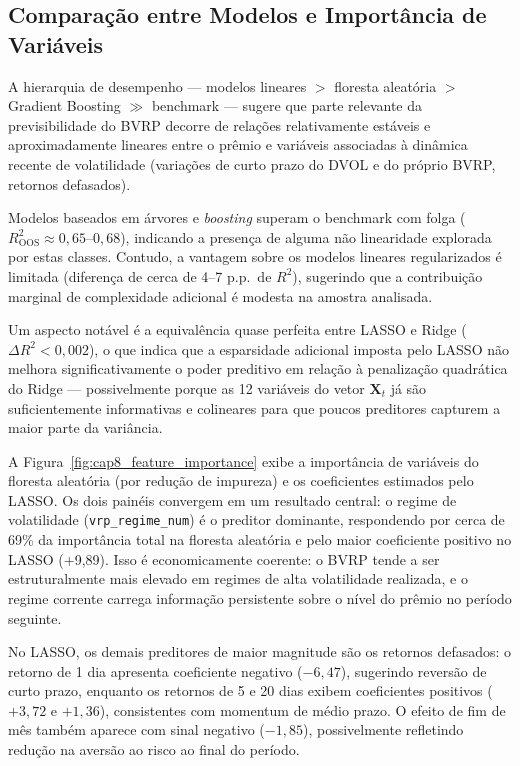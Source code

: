 \subsection{Comparação entre Modelos e Importância de Variáveis}
\label{sec:cap8_comparacao}

A hierarquia de desempenho --- modelos lineares $>$ floresta aleatória $>$ Gradient
Boosting $\gg$ benchmark --- sugere que parte relevante da previsibilidade do BVRP
decorre de relações relativamente estáveis e aproximadamente lineares entre o prêmio
e variáveis associadas à dinâmica recente de volatilidade (variações de curto prazo
do DVOL e do próprio BVRP, retornos defasados).

Modelos baseados em árvores e \textit{boosting} superam o benchmark com folga
($R^2_{\text{OOS}} \approx 0{,}65$--$0{,}68$), indicando a presença de alguma
não linearidade explorada por estas classes. Contudo, a vantagem sobre os modelos
lineares regularizados é limitada (diferença de cerca de 4--7 p.p.\ de $R^2$),
sugerindo que a contribuição marginal de complexidade adicional é modesta na
amostra analisada.

Um aspecto notável é a equivalência quase perfeita entre LASSO e Ridge
($\Delta R^2 < 0{,}002$), o que indica que a esparsidade adicional imposta
pelo LASSO não melhora significativamente o poder preditivo em relação à
penalização quadrática do Ridge --- possivelmente porque as 12 variáveis do vetor
$\mathbf{X}_t$ já são suficientemente informativas e colineares para que
poucos preditores capturem a maior parte da variância.

A Figura~\ref{fig:cap8_feature_importance} exibe a importância de variáveis
do floresta aleatória (por redução de impureza) e os coeficientes estimados pelo LASSO.
Os dois painéis convergem em um resultado central: o regime de volatilidade
(\texttt{vrp\_regime\_num}) é o preditor dominante, respondendo por cerca de 69\%
da importância total na floresta aleatória e pelo maior coeficiente positivo no LASSO
(+9,89). Isso é economicamente coerente: o BVRP tende a ser estruturalmente mais
elevado em regimes de alta volatilidade realizada, e o regime corrente carrega
informação persistente sobre o nível do prêmio no período seguinte.

No LASSO, os demais preditores de maior magnitude são os retornos defasados:
o retorno de 1 dia apresenta coeficiente negativo ($-6{,}47$), sugerindo reversão
de curto prazo, enquanto os retornos de 5 e 20 dias exibem coeficientes positivos
($+3{,}72$ e $+1{,}36$), consistentes com momentum de médio prazo. O efeito de
fim de mês também aparece com sinal negativo ($-1{,}85$), possivelmente refletindo
redução na aversão ao risco ao final do período.

